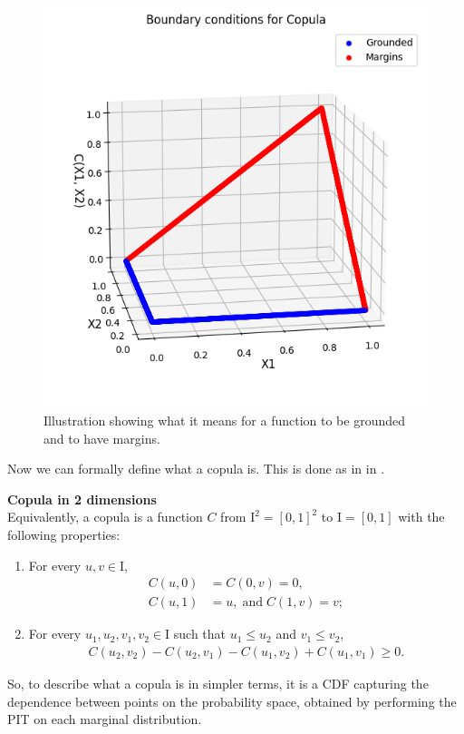 \begin{figure}
    \centering
    \includegraphics[width=0.5\linewidth]{3Theory/pictures/CopulaBoundaries.png}
    \caption{Illustration showing what it means for a function to be grounded and to have margins.}
    \label{fig:GroundedAndMargins}
\end{figure}

Now we can formally define what a copula is. This is done as in  in .
\begin{definition}\label{def:copula}
            \textbf{Copula in 2 dimensions}\\
            Equivalently, a copula is a function $C$ from $\mathrm{I}^2=[0,1]^2$ to $\mathrm{I} = [0,1]$ with the following properties:
            \begin{enumerate}
                \item For every $u, v \in \mathrm{I}$,
                \begin{align*}
                    C(u,0) &= C(0,v) = 0,\\
                    C(u,1) &= u, \; \mathrm{and } \; C(1,v) = v;
                \end{align*}
                \item For every $u_1, u_2, v_1, v_2 \in \mathrm{I}$ such that $u_1 \leq u_2$ and $v_1 \leq v_2$,
                \begin{align*}
                    C(u_2,v_2) - C(u_2,v_1) - C(u_1,v_2) + C(u_1,v_1) \geq 0.
                \end{align*}
            \end{enumerate}
\end{definition}

So, to describe what a copula is in simpler terms, it is a \gls{CDF} capturing the dependence between points on the probability space, obtained by performing the \gls{PIT} on each marginal distribution. 

